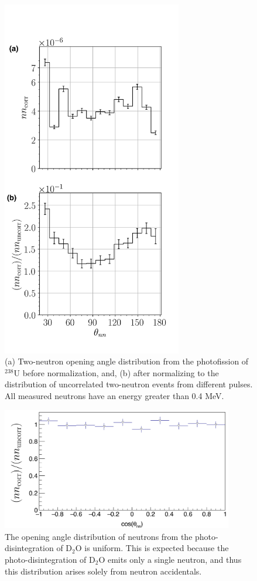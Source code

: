 \begin{figure}[]
\centering
    \includegraphics[width=0.7\textwidth]{Content/Methods/SPDPNormalization.png}
    \caption{(a) Two-neutron opening angle distribution from the photofission of $^{238}$U before normalization, and, (b) after normalizing to the distribution of uncorrelated two-neutron events from different pulses.
    All measured neutrons have an energy greater than 0.4 MeV.}
    \label{fig:SPDPNormalization}
\end{figure}
\begin{figure}[h]
\includegraphics[width=0.9\textwidth]{Content/Methods/D2Otheta_nn.png}
\caption{The opening angle distribution of neutrons from the photo-disintegration of D$_{2}$O is uniform.
This is expected because the photo-disintegration of D$_{2}$O emits only a single neutron, and thus this distribution arises solely from neutron accidentals.}
\label{fig:D2Otheta_nn}
\end{figure}

